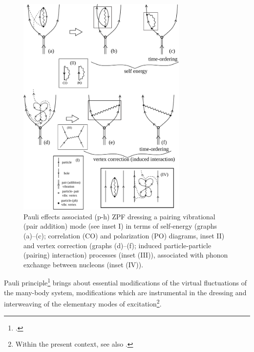  \begin{figure}[h!]
 	\begin{center}
\includegraphics*[width=0.75\textwidth]{C7/figs_C7/FigB.pdf}
\end{center}
\caption{Pauli effects associated (p-h) ZPF dressing a pairing vibrational (pair addition) mode (see inset I) in terms of self-energy (graphs (a)--(c); correlation (CO) and polarization (PO) diagrams, inset II) and vertex correction (graphs (d)--(f); induced particle-particle (pairing) interaction) processes (inset (III)), associated with phonon exchange between nucleons (inset (IV)).}\label{figB}
\end{figure}
Pauli principle\footnote{\cite{Pauli:25}.} brings about essential modifications of the virtual fluctuations of the many-body system, modifications which are instrumental in the dressing and interweaving of the elementary modes of excitation\footnote{Within the present context, see also \cite{Schrieffer:64}.}.


